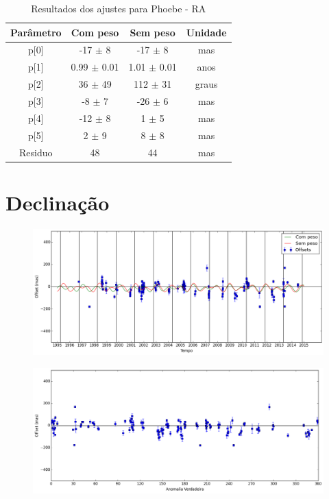 \documentclass[11pt,a4paper]{report}
\begin{document}
\begin{table}[h!]
\caption{\label{Tab: Phoebe-RA} Resultados dos ajustes para Phoebe - RA}
\begin{centering}
\begin{tabular}{cccc}
\hline
\hline
Parâmetro & Com peso & Sem peso & Unidade\tabularnewline
\hline
p[0] & -17 $\pm$ 8 & -17 $\pm$ 8 & mas\\
p[1] & 0.99 $\pm$ 0.01 & 1.01 $\pm$ 0.01 & anos\\
p[2] & 36 $\pm$ 49 & 112 $\pm$ 31 & graus\\
p[3] & -8 $\pm$ 7 & -26 $\pm$ 6 & mas\\
p[4] & -12 $\pm$ 8 & 1 $\pm$ 5 & mas\\
p[5] & 2 $\pm$ 9 & 8 $\pm$ 8 & mas\\
Residuo & 48 & 44 & mas\\
\hline 
\end{tabular} 
\par\end{centering}
\end{table}

\section*{Declinação}

\begin{figure}[h]
\includegraphics[scale=0.45]{Phoebe/DEC.png} 
\end{figure}

\begin{figure}[h]
\includegraphics[scale=0.45]{Phoebe/DEC_anom.png}  
\end{figure}
\end{document}

